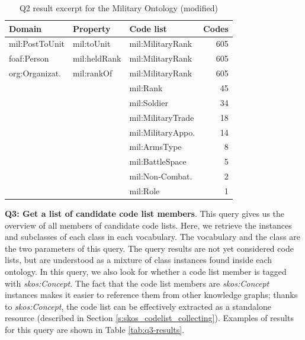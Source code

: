 \begin{table}[ht]
\footnotesize
\centering
\begin{tabular}{|l|l|l|r|}
\hline
\textbf{Domain}  & \textbf{Property} & \textbf{Code list} & \textbf{Codes} \\ \hline
mil:PostToUnit   & mil:toUnit        & mil:MilitaryRank           & 605              \\ \hline
foaf:Person      & mil:heldRank      & mil:MilitaryRank           & 605              \\ \hline
org:Organizat.   & mil:rankOf        & mil:MilitaryRank           & 605              \\ \hline
                 &                   & mil:Rank                   & 45               \\ \hline
                 &                   & mil:Soldier                & 34               \\ \hline
                 &                   & mil:MilitaryTrade          & 18               \\ \hline
                 &                   & mil:MilitaryAppo.          & 14               \\ \hline
                 &                   & mil:ArmsType               & 8                \\ \hline
                 &                   & mil:BattleSpace            & 5                \\ \hline
                 &                   & mil:Non-Combat.            & 2                \\ \hline
                 &                   & mil:Role                   & 1                \\ \hline
\end{tabular}
\caption{Q2 result excerpt for the Military Ontology (modified)} \label{tab:q2-results}
\end{table}

\medskip
\medskip
\medskip
\noindent\textbf{Q3: Get a list of candidate code list members}. This query gives us the overview of all members of candidate code lists. Here, we retrieve the instances and subclasses of each class in each vocabulary. The vocabulary and the class are the two parameters of this query. The query results are not yet considered code lists, but are understood as a mixture of class instances found inside each ontology. In this query, we also look for whether a code list member is tagged with \emph{skos:Concept}. The fact that the code list members are \emph{skos:Concept} instances makes it easier to reference them from other knowledge graphs; thanks to \emph{skos:Concept}, the code list can be effectively extracted as a standalone resource (described in Section \ref{s:skos_codelist_collecting}). Examples of results for this query are shown in Table \ref{tab:q3-results}.

